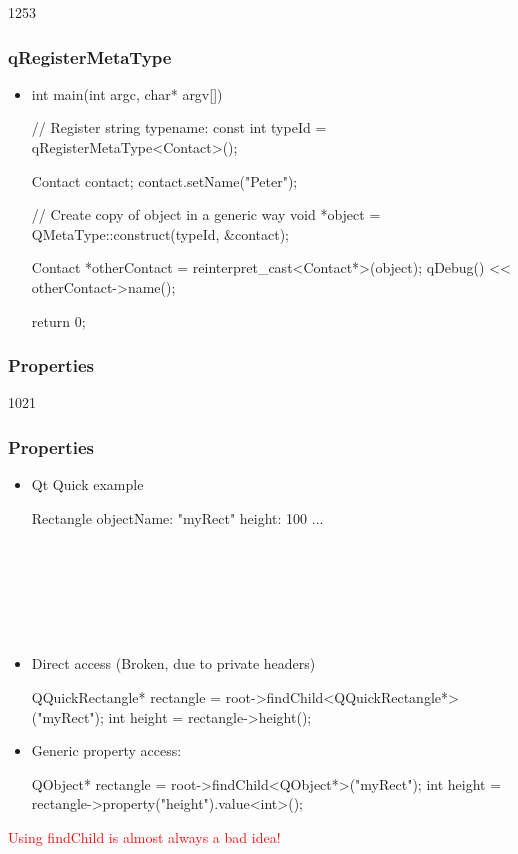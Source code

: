 \begin{slide}[fragile]{1253}
\frametitle{qRegisterMetaType}
\begin{itemize}
\item[]
\begin{cpp}
int main(int argc, char* argv[])
{
    // Register string typename:
    const int typeId = qRegisterMetaType<Contact>();

    Contact contact;
    contact.setName("Peter");

    // Create copy of object in a generic way
    void *object = QMetaType::construct(typeId, &contact);

    Contact *otherContact = reinterpret_cast<Contact*>(object);
    qDebug() << otherContact->name();

    return 0;
}
\end{cpp}
\end{itemize}
\end{slide}


\subsubsection{Properties}
\begin{slide}[fragile]{1021}
\frametitle{Properties}
\begin{itemize}
\item Qt Quick example\\[2mm]
\begin{EXCLUDE}
Rectangle {
    objectName: "myRect"
    height: 100
    ...
}
\end{EXCLUDE}
\begin{qml}
\\
\\
\\
\\
\qtt{\}}\\
\end{qml}\medskip

\item Direct access (Broken, due to private headers)
  \begin{cpp}
QQuickRectangle* rectangle
  = root->findChild<QQuickRectangle*>("myRect");
int height = rectangle->height();
  \end{cpp}\medskip

\item Generic property access:\\
\begin{cpp}
QObject* rectangle = root->findChild<QObject*>("myRect");
int height = rectangle->property("height").value<int>();
\end{cpp}
\end{itemize}
\hfill\tiny\textcolor{red}{Using findChild is almost always a bad idea!}
\end{slide}

